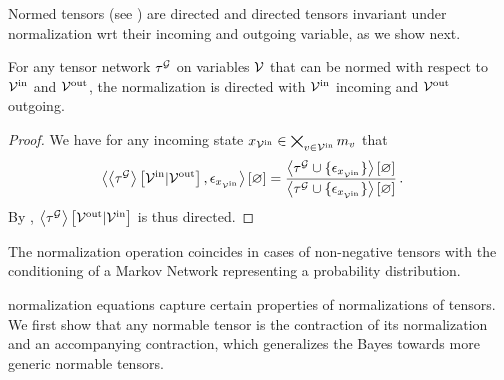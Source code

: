 Normed tensors (see ) are directed and directed tensors invariant under normalization wrt their incoming and outgoing variable, as we show next.

\begin{theorem}
    \label{the:normalizationDirected}
    For any tensor network $\tau^{\mathcal{G}}$ on variables $\mathcal{V}$ that can be normed with respect to $\mathcal{V}^{\mathrm{in}}$ and $\mathcal{V}^{\mathrm{out}}$, the normalization is directed with $\mathcal{V}^{\mathrm{in}}$ incoming and $\mathcal{V}^{\mathrm{out}}$ outgoing.
\end{theorem}
\begin{proof}
    We have for any incoming state ${x_{\mathcal{V}^{\mathrm{in}}}\in\bigtimes_{v\in\mathcal{V}^{\mathrm{in}}}m_{v}}$ that
    \begin{align*}
        \left\langle \left\langle \tau^{\mathcal{G}}\right\rangle \left[ \mathcal{V}^{\mathrm{in}} | \mathcal{V}^{\mathrm{out}} \right], \epsilon_{x_{\mathcal{V}^{\mathrm{in}}}}\right\rangle \left[ \varnothing \right]
        & =  \frac{
            \left\langle \tau^{\mathcal{G}}\cup\{\epsilon_{x_{\mathcal{V}^{\mathrm{in}}}}\}\right\rangle \left[ \varnothing \right]
        }{
            \left\langle \tau^{\mathcal{G}}\cup\{\epsilon_{x_{\mathcal{V}^{\mathrm{in}}}}\}\right\rangle \left[ \varnothing \right]
        } \, .
    \end{align*}
    By , $\left\langle \tau^{\mathcal{G}}\right\rangle \left[ \mathcal{V}^{\mathrm{out}} | \mathcal{V}^{\mathrm{in}} \right]$ is thus directed.
\end{proof}

The normalization operation coincides in cases of non-negative tensors with the conditioning of a Markov Network representing a probability distribution.


normalization equations capture certain properties of normalizations of tensors.
We first show that any normable tensor is the contraction of its normalization and an accompanying contraction, which generalizes the Bayes  towards more generic normable tensors.

